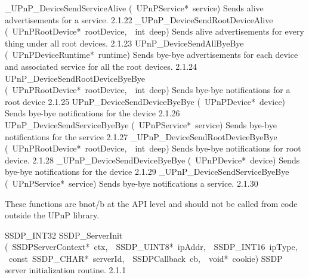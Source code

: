 \documentclass{article}
\begin{document}
\begin{cxxentry}
\begin{cxxentry}
\begin{cxxnames}
        {\_UPnP\_DeviceSendServiceAlive}
        {(\ UPnPService*\ service)}
        {Sends alive advertisements for a service.}
        {2.1.22}
        {\_UPnP\_DeviceSendRootDeviceAlive}
        {(\ UPnPRootDevice*\ rootDevice,\ \ int\ deep)}
        {Sends alive advertisements for every thing under all root devices. }
        {2.1.23}
        {UPnP\_DeviceSendAllByeBye}
        {(\ UPnPDeviceRuntime*\ runtime)}
        {Sends bye-bye advertisements for each device and associated service for all the root devices.}
        {2.1.24}
        {UPnP\_DeviceSendRootDeviceByeBye}
        {(\ UPnPRootDevice*\ rootDevice,\ \ int\ deep)}
        {Sends bye-bye notifications for a root device}
        {2.1.25}
        {UPnP\_DeviceSendDeviceByeBye}
        {(\ UPnPDevice*\ device)}
        {Sends bye-bye notifications for the device}
        {2.1.26}
        {UPnP\_DeviceSendServiceByeBye}
        {(\ UPnPService*\ service)}
        {Sends bye-bye notifications for the service}
        {2.1.27}
        {\_UPnP\_DeviceSendRootDeviceByeBye}
        {(\ UPnPRootDevice*\ rootDevice,\ \ int\ deep)}
        {Sends bye-bye notifications for root device.}
        {2.1.28}
        {\_UPnP\_DeviceSendDeviceByeBye}
        {(\ UPnPDevice*\ device)}
        {Sends bye-bye notifications for the device}
        {2.1.29}
        {\_UPnP\_DeviceSendServiceByeBye}
        {(\ UPnPService*\ service)}
        {Sends bye-bye notifications a service.}
        {2.1.30}
\end{cxxnames}
\begin{cxxdoc}
These functions are \<b\>not\</b\> at the API level and should not be called from
code outside the UPnP library. 
\end{cxxdoc}
\begin{cxxfunction}
{SSDP\_INT32}
        {SSDP\_ServerInit}
        {(\ SSDPServerContext*\ ctx,\ \ SSDP\_UINT8*\ ipAddr,\ \ SSDP\_INT16\ ipType,\ \ const\ SSDP\_CHAR*\ serverId,\ \ SSDPCallback\ cb,\ \ void*\ cookie)}
        {SSDP server initialization routine. }
        {2.1.1}
\end{cxxfunction}
\end{cxxentry}
\end{cxxentry}
\end{document}
